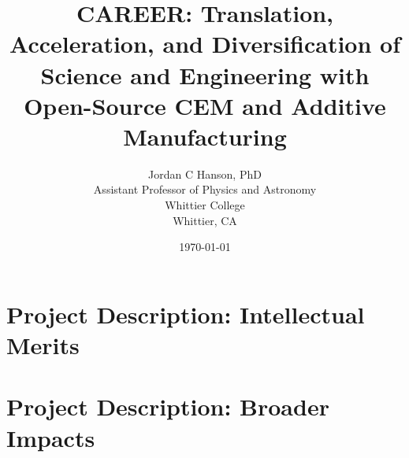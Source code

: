 \documentclass[10pt,twoside,openany]{book}
\title{CAREER: Translation, Acceleration, and Diversification of Science and Engineering with Open-Source CEM and Additive Manufacturing}
\author{Jordan C Hanson, PhD \\ Assistant Professor of Physics and Astronomy \\ Whittier College \\ Whittier, CA}
\date{\today}
\begin{document}
\begin{flushleft}

\end{flushleft}

\begin{flushleft}

\end{flushleft}

\maketitle
\tableofcontents
\thispagestyle{empty}

\chapter{Project Description: Intellectual Merits}
\thispagestyle{empty}
\begin{flushleft}

\end{flushleft}

\chapter{Project Description: Broader Impacts}
\thispagestyle{empty}
\begin{flushleft}

\end{flushleft}

\small


 
\end{document}

